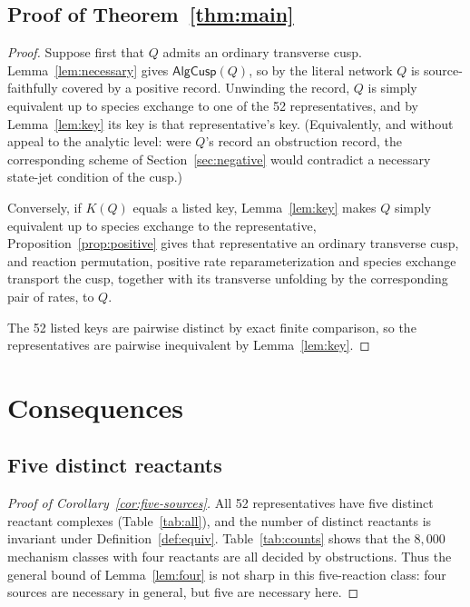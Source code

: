 \documentclass[11pt,a4paper]{article}
\theoremstyle{plain}
\theoremstyle{definition}
\theoremstyle{remark}
\numberwithin{equation}{section}
\newcommand{\AlgCusp}{\mathsf{AlgCusp}}
\begin{document}
\subsection{Proof of Theorem~\ref{thm:main}}
\begin{proof}
Suppose first that $Q$ admits an ordinary transverse cusp. Lemma~\ref{lem:necessary} gives $\AlgCusp(Q)$, so by  the literal network $Q$ is source-faithfully covered by a positive record. Unwinding the record, $Q$ is simply equivalent up to species exchange to one of the 52 representatives, and by Lemma~\ref{lem:key} its key is that representative's key. (Equivalently, and without appeal to the analytic level: were $Q$'s record an obstruction record, the corresponding scheme of Section~\ref{sec:negative} would contradict a necessary state-jet condition of the cusp.)

Conversely, if $K(Q)$ equals a listed key, Lemma~\ref{lem:key} makes $Q$ simply equivalent up to species exchange to the representative, Proposition~\ref{prop:positive} gives that representative an ordinary transverse cusp, and reaction permutation, positive rate reparameterization and species exchange transport the cusp, together with its transverse unfolding by the corresponding pair of rates, to $Q$.

The 52 listed keys are pairwise distinct by exact finite comparison, so the representatives are pairwise inequivalent by Lemma~\ref{lem:key}.
\end{proof}

\section{Consequences}\label{sec:consequences}

\subsection{Five distinct reactants}
\begin{proof}[Proof of Corollary~\ref{cor:five-sources}]
All 52 representatives have five distinct reactant complexes (Table~\ref{tab:all}), and the number of distinct reactants is invariant under Definition~\ref{def:equiv}. Table~\ref{tab:counts} shows that the $8{,}000$ mechanism classes with four reactants are all decided by obstructions. Thus the general bound of Lemma~\ref{lem:four} is not sharp in this five-reaction class: four sources are necessary in general, but five are necessary here.
\end{proof}
\end{document}
